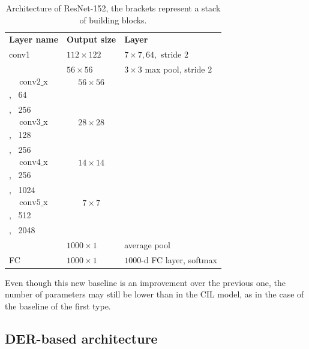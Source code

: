 \begin{table}
    \centering
    \begingroup
    
    \begin{tabular}{>{\centering\arraybackslash}p{}|>{\centering\arraybackslash}p{}|>{\centering\arraybackslash}p{}}


        \hline
        \multicolumn{3}{c}{\textbf{ResNet-152 architecture}}\\
        \hline
        \textbf{Layer name} & \textbf{Output size} & \textbf{Layer} \\
        \hline
        \hline
        conv1 & $112 \times 122$ & $7 \times 7, 64,$ stride $2$ \\
        \hline
          & $56 \times 56$ & $3 \times 3$ max pool, stride $2$ \\
        \hline

        \[ \textrm{conv2\char`_x} \] &  \[56 \times 56 \] & \[\left[ \begin{array}{c} 1 \times 1, \, 64\\ 3 \times 3, \, 64 \\ 1 \times 1, \, 256  \end{array} \right] \times 3 \]\\
        \hline

        \[ \textrm{conv3\char`_x} \] &  \[28 \times 28 \] & \[\left[ \begin{array}{c} 1 \times 1, \, 128 \\ 3 \times 3, \, 128  \\ 1 \times 1, \, 256  \end{array}\right] \times 8 \]\\
        \hline

        \[ \textrm{conv4\char`_x} \] &  \[14 \times 14 \] & \[\left[ \begin{array}{c} 1 \times 1, \, 256\\ 3 \times 3, \, 256\\ 1 \times 1, \, 1024  \end{array}\right] \times 36 \]\\
        \hline

        \[ \textrm{conv5\char`_x} \] &  \[7 \times 7 \] & \[\left[ \begin{array}{c} 1 \times 1, \, 512\\ 3 \times 3, \, 512\\ 1 \times 1, \, 2048  \end{array}\right] \times 3 \]\\
        \hline
        & $1000 \times 1$ & average pool \\
        \hline
        FC & $1000 \times 1$ & $1000$-d FC layer, softmax \\
        \hline
        \end{tabular}
    \endgroup
    \caption{Architecture of ResNet-152, the brackets represent a stack of building blocks.}
    \label{table:resnet-152}
\end{table}

Even though this new baseline is an improvement over the previous one, the number of parameters may still be lower than in the CIL model, as in the case of the baseline of the first type.

\subsection{DER-based architecture}